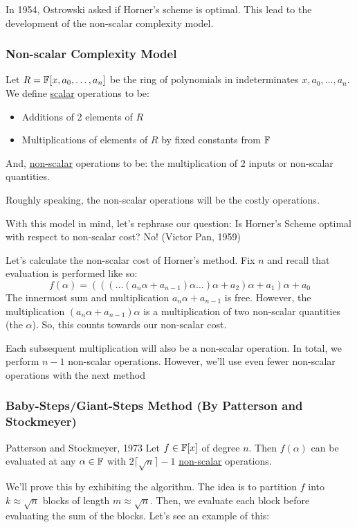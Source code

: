 In 1954, Ostrowski asked if Horner's scheme is optimal.
This lead to the development of the non-scalar complexity model.

\subsubsection{Non-scalar Complexity Model}
Let $R = \operatorname{\mathbb{F}}[x, a_0, \ldots, a_n]$ be the ring of polynomials in indeterminates $x, a_0, \ldots, a_n$.
We define \ul{scalar} operations to be:
\begin{itemize}
    \item Additions of 2 elements of $R$
    \item Multiplications of elements of $R$ by fixed constants from $\operatorname{\mathbb{F}}$
\end{itemize}
And, \ul{non-scalar} operations to be: the multiplication of 2 inputs or non-scalar quantities.

Roughly speaking, the non-scalar operations will be the costly operations.

With this model in mind, let's rephrase our question: Is Horner's Scheme optimal with respect to non-scalar cost?
No! (Victor Pan, 1959)

Let's calculate the non-scalar cost of Horner's method.
Fix $n$ and recall that evaluation is performed like so:
\begin{equation*}
    f(\alpha) = (((\ldots(a_n\alpha + a_{n-1})\alpha\ldots)\alpha + a_2)\alpha + a_1)\alpha + a_0
\end{equation*}
The innermost sum and multiplication $a_n\alpha + a_{n-1}$ is free.
However, the multiplication $(a_n\alpha + a_{n-1})\alpha$ is a multiplication of two non-scalar quantities (the $\alpha$).
So, this counts towards our non-scalar cost.

Each subsequent multiplication will also be a non-scalar operation.
In total, we perform $n-1$ non-scalar operations.
However, we'll use even fewer non-scalar operations with the next method

\subsubsection{Baby-Steps/Giant-Steps Method (By Patterson and Stockmeyer)}
\begin{theorem}{Patterson and Stockmeyer, 1973}{}
    Let $f \in \operatorname{\mathbb{F}}[x]$ of degree $n$. Then $f(\alpha)$ can be evaluated at any $\alpha \in \operatorname{\mathbb{F}}$ with $2\lceil \sqrt{n} \rceil - 1$ \ul{non-scalar} operations.
\end{theorem}
We'll prove this by exhibiting the algorithm.
The idea is to partition $f$ into $k \approx \sqrt{n}$ blocks of length $m \approx \sqrt{n}$.
Then, we evaluate each block before evaluating the sum of the blocks.
Let's see an example of this:

